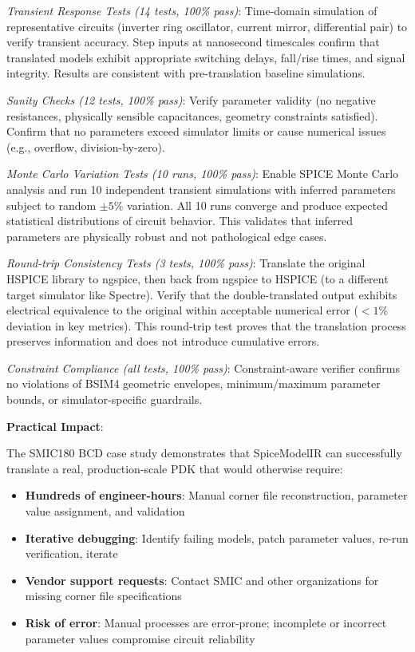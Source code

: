 \documentclass[conference]{IEEEtran}
\begin{document}
\textit{Transient Response Tests (14 tests, 100\% pass)}: Time-domain simulation of representative circuits (inverter ring oscillator, current mirror, differential pair) to verify transient accuracy. Step inputs at nanosecond timescales confirm that translated models exhibit appropriate switching delays, fall/rise times, and signal integrity. Results are consistent with pre-translation baseline simulations.

\textit{Sanity Checks (12 tests, 100\% pass)}: Verify parameter validity (no negative resistances, physically sensible capacitances, geometry constraints satisfied). Confirm that no parameters exceed simulator limits or cause numerical issues (e.g., overflow, division-by-zero).

\textit{Monte Carlo Variation Tests (10 runs, 100\% pass)}: Enable SPICE Monte Carlo analysis and run 10 independent transient simulations with inferred parameters subject to random $\pm 5\%$ variation. All 10 runs converge and produce expected statistical distributions of circuit behavior. This validates that inferred parameters are physically robust and not pathological edge cases.

\textit{Round-trip Consistency Tests (3 tests, 100\% pass)}: Translate the original HSPICE library to ngspice, then back from ngspice to HSPICE (to a different target simulator like Spectre). Verify that the double-translated output exhibits electrical equivalence to the original within acceptable numerical error ($< 1\%$ deviation in key metrics). This round-trip test proves that the translation process preserves information and does not introduce cumulative errors.

\textit{Constraint Compliance (all tests, 100\% pass)}: Constraint-aware verifier confirms no violations of BSIM4 geometric envelopes, minimum/maximum parameter bounds, or simulator-specific guardrails.

\textbf{Practical Impact}:

The SMIC180 BCD case study demonstrates that SpiceModelIR can successfully translate a real, production-scale PDK that would otherwise require:
\begin{itemize}
\item \textbf{Hundreds of engineer-hours}: Manual corner file reconstruction, parameter value assignment, and validation
\item \textbf{Iterative debugging}: Identify failing models, patch parameter values, re-run verification, iterate
\item \textbf{Vendor support requests}: Contact SMIC and other organizations for missing corner file specifications
\item \textbf{Risk of error}: Manual processes are error-prone; incomplete or incorrect parameter values compromise circuit reliability
\end{itemize}
\end{document}
